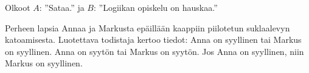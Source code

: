 \begin{tehtavasivu}
\begin{tehtava}
    \begin{vastaus}
    Olkoot $A$: ''Sataa.'' ja $B$: ''Logiikan opiskelu on hauskaa.''
    \end{vastaus}
    
\end{tehtava}

\begin{tehtava}
    Perheen lapsia Annaa ja Markusta epäillään kaappiin piilotetun suklaalevyn katoamisesta. Luotettava todistaja kertoo tiedot:
Anna on syyllinen tai Markus on syyllinen.
Anna on syytön tai Markus on syytön. 
Jos Anna on syyllinen, niin Markus on syyllinen.


\end{tehtava}
\end{tehtavasivu}
